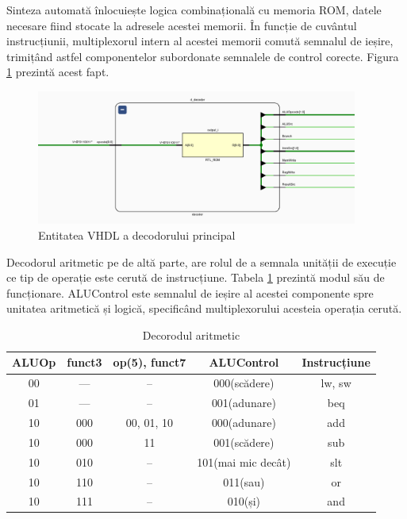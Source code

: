 \documentclass[12pt]{article}
\begin{document}
 
 Sinteza automată înlocuiește logica combinațională cu memoria ROM, datele necesare fiind stocate la adresele acestei memorii. În funcție de cuvântul instrucțiunii, multiplexorul intern al acestei memorii comută semnalul de ieșire, trimițând astfel componentelor subordonate semnalele de control corecte. Figura \ref{Figura:45} prezintă acest fapt.
 
  \begin{figure}[h!]
 \includegraphics[width=0.94\textwidth]{decoder.png}
 \centering
 \caption{Entitatea VHDL a decodorului principal}
 \label{Figura:45}
 \end{figure}

Decodorul aritmetic pe de altă parte, are rolul de a semnala unității de execuție ce tip de operație este cerută de instrucțiune. Tabela \ref{Tabela:17} prezintă modul său de funcționare. ALUControl este semnalul de ieșire al acestei componente spre unitatea aritmetică și logică, specificând multiplexorului acesteia operația cerută.

\newpage
 \begin{table}[h]
\centering
\caption{Decorodul aritmetic}
\label{Tabela:17}
\begin{tabular}{ ||c|c|c|c|c|| }
 \hline
 ALUOp & funct3 & {op(5), funct7} & ALUControl & Instrucțiune\\ 
 \hline
 00 & --- & -- & 000(scădere) & lw, sw\\
 \hline
 01 & --- & -- & 001(adunare) & beq\\
 \hline
 10 & 000 & 00, 01, 10 & 000(adunare) & add\\
 \hline
 10 & 000 & 11 & 001(scădere) & sub\\
 \hline
 10 & 010 & -- & 101(mai mic decât) & slt\\
 \hline
 10 & 110 & -- & 011(sau) & or\\ 
\hline
 10 & 111 & -- & 010(și) & and\\
 \hline
\end{tabular}
\end{table}
\end{document}
